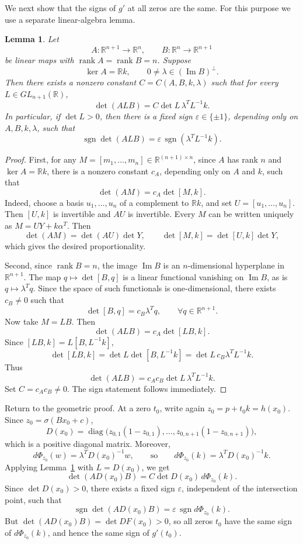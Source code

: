 \documentclass[a4paper,11pt]{article}
\theoremstyle{plain}
\newtheorem{lemma}[theorem]{Lemma}
\theoremstyle{definition}
\theoremstyle{remark}
\DeclareMathOperator{\rank}{rank}
\DeclareMathOperator{\Imop}{Im}
\DeclareMathOperator{\diag}{diag}
\DeclareMathOperator{\sgn}{sgn}
\begin{document}
We next show that the signs of \(g'\) at all zeros are the same. For this purpose we use a separate linear-algebra lemma.

\begin{lemma}\label{lem:det-comparison}
Let
\[
A:\mathbb R^{n+1}\to\mathbb R^n,
\qquad
B:\mathbb R^n\to\mathbb R^{n+1}
\]
be linear maps with \(\rank A=\rank B=n\). Suppose
\[
\ker A=\mathbb R k,
\qquad
0\ne\lambda\in(\Imop B)^\perp.
\]
Then there exists a nonzero constant \(C=C(A,B,k,\lambda)\) such that for every \(L\in GL_{n+1}(\mathbb R)\),
\[
\det(ALB)=C\det L\,\lambda^TL^{-1}k.
\]
In particular, if \(\det L>0\), then there is a fixed sign \(\varepsilon\in\{\pm1\}\), depending only on \(A,B,k,\lambda\), such that
\[
\sgn\det(ALB)=\varepsilon\,\sgn(\lambda^TL^{-1}k).
\]
\end{lemma}

\begin{proof}
First, for any \(M=[m_1,\ldots,m_n]\in\mathbb R^{(n+1)\times n}\), since \(A\) has rank \(n\) and \(\ker A=\mathbb Rk\), there is a nonzero constant \(c_A\), depending only on \(A\) and \(k\), such that
\[
\det(AM)=c_A\det[M,k].
\]
Indeed, choose a basis \(u_1,\ldots,u_n\) of a complement to \(\mathbb Rk\), and set \(U=[u_1,\ldots,u_n]\). Then \([U,k]\) is invertible and \(AU\) is invertible. Every \(M\) can be written uniquely as \(M=UY+k\alpha^T\). Then
\[
\det(AM)=\det(AU)\det Y,
\qquad
\det[M,k]=\det[U,k]\det Y,
\]
which gives the desired proportionality.

Second, since \(\rank B=n\), the image \(\Imop B\) is an \(n\)-dimensional hyperplane in \(\mathbb R^{n+1}\). The map \(q\mapsto\det[B,q]\) is a linear functional vanishing on \(\Imop B\), as is \(q\mapsto\lambda^Tq\). Since the space of such functionals is one-dimensional, there exists \(c_B\ne0\) such that
\[
\det[B,q]=c_B\lambda^Tq,
\qquad \forall q\in\mathbb R^{n+1}.
\]
Now take \(M=LB\). Then
\[
\det(ALB)=c_A\det[LB,k].
\]
Since \([LB,k]=L[B,L^{-1}k]\),
\[
\det[LB,k]=\det L\det[B,L^{-1}k]
=\det L\,c_B\lambda^TL^{-1}k.
\]
Thus
\[
\det(ALB)=c_Ac_B\det L\,\lambda^TL^{-1}k.
\]
Set \(C=c_Ac_B\ne0\). The sign statement follows immediately.
\end{proof}

Return to the geometric proof. At a zero \(t_0\), write again \(z_0=p+t_0k=h(x_0)\). Since \(z_0=\sigma(Bx_0+c)\),
\[
D(x_0)=\diag\bigl(z_{0,1}(1-z_{0,1}),\ldots,z_{0,n+1}(1-z_{0,n+1})\bigr),
\]
which is a positive diagonal matrix. Moreover,
\[
d\Phi_{z_0}(w)=\lambda^TD(x_0)^{-1}w,
\qquad
\text{so}
\qquad
d\Phi_{z_0}(k)=\lambda^TD(x_0)^{-1}k.
\]
Applying Lemma~\ref{lem:det-comparison} with \(L=D(x_0)\), we get
\[
\det(AD(x_0)B)=C\det D(x_0)\,d\Phi_{z_0}(k).
\]
Since \(\det D(x_0)>0\), there exists a fixed sign \(\varepsilon\), independent of the intersection point, such that
\[
\sgn\det(AD(x_0)B)=\varepsilon\,\sgn d\Phi_{z_0}(k).
\]
But \(\det(AD(x_0)B)=\det DF(x_0)>0\), so all zeros \(t_0\) have the same sign of \(d\Phi_{z_0}(k)\), and hence the same sign of \(g'(t_0)\).
\end{document}
